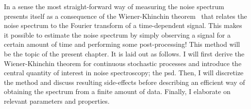 In a sense the most straight-forward way of measuring the noise spectrum presents itself as a consequence of the Wiener-Khinchin theorem~\cite{Wiener1930,Khintchine1934} that relates the noise spectrum to the Fourier transform of a time-dependent signal.
This makes it possible to estimate the noise spectrum by simply observing a signal for a certain amount of time and performing some post-processing!
This method will be the topic of the present chapter.
It is laid out as follows.
I will first derive the Wiener-Khinchin theorem for continuous stochastic processes and introduce the central quantity of interest in noise spectroscopy; the \gls{psd}.
Then, I will discretize the method and discuss resulting side-effects before describing an efficient way of obtaining the spectrum from a finite amount of data.
Finally, I elaborate on relevant parameters and properties.

